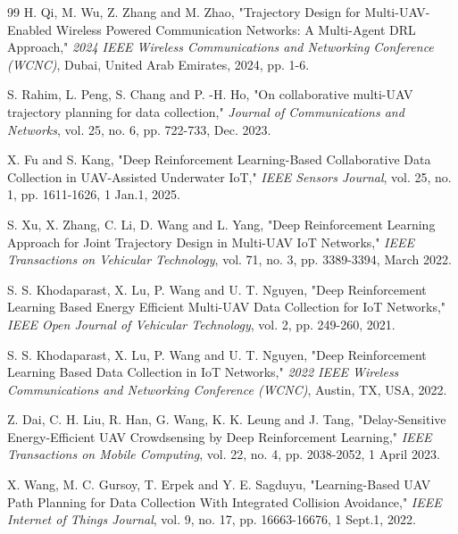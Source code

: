 \documentclass[journal]{IEEEtran}
\begin{document}
\begin{thebibliography}{99}
     H. Qi, M. Wu, Z. Zhang and M. Zhao, "Trajectory Design for Multi-UAV-Enabled Wireless Powered Communication Networks: A Multi-Agent DRL Approach," \textit{2024 IEEE Wireless Communications and Networking Conference (WCNC)}, Dubai, United Arab Emirates, 2024, pp. 1-6. 
        
     S. Rahim, L. Peng, S. Chang and P. -H. Ho, "On collaborative multi-UAV trajectory planning for data collection," \textit{Journal of Communications and Networks}, vol. 25, no. 6, pp. 722-733, Dec. 2023.
        
     X. Fu and S. Kang, "Deep Reinforcement Learning-Based Collaborative Data Collection in UAV-Assisted Underwater IoT," \textit{IEEE Sensors Journal}, vol. 25, no. 1, pp. 1611-1626, 1 Jan.1, 2025.
        
     S. Xu, X. Zhang, C. Li, D. Wang and L. Yang, "Deep Reinforcement Learning Approach for Joint Trajectory Design in Multi-UAV IoT Networks," \textit{IEEE Transactions on Vehicular Technology}, vol. 71, no. 3, pp. 3389-3394, March 2022.
        
     S. S. Khodaparast, X. Lu, P. Wang and U. T. Nguyen, "Deep Reinforcement Learning Based Energy Efficient Multi-UAV Data Collection for IoT Networks," \textit{IEEE Open Journal of Vehicular Technology}, vol. 2, pp. 249-260, 2021. 
        
     S. S. Khodaparast, X. Lu, P. Wang and U. T. Nguyen, "Deep Reinforcement Learning Based Data Collection in IoT Networks," \textit{2022 IEEE Wireless Communications and Networking Conference (WCNC)}, Austin, TX, USA, 2022.
        
     Z. Dai, C. H. Liu, R. Han, G. Wang, K. K. Leung and J. Tang, "Delay-Sensitive Energy-Efficient UAV Crowdsensing by Deep Reinforcement Learning," \textit{IEEE Transactions on Mobile Computing}, vol. 22, no. 4, pp. 2038-2052, 1 April 2023.
        
    X. Wang, M. C. Gursoy, T. Erpek and Y. E. Sagduyu, "Learning-Based UAV Path Planning for Data Collection With Integrated Collision Avoidance," \textit{IEEE Internet of Things Journal}, vol. 9, no. 17, pp. 16663-16676, 1 Sept.1, 2022.
        

\end{thebibliography}
\end{document}
